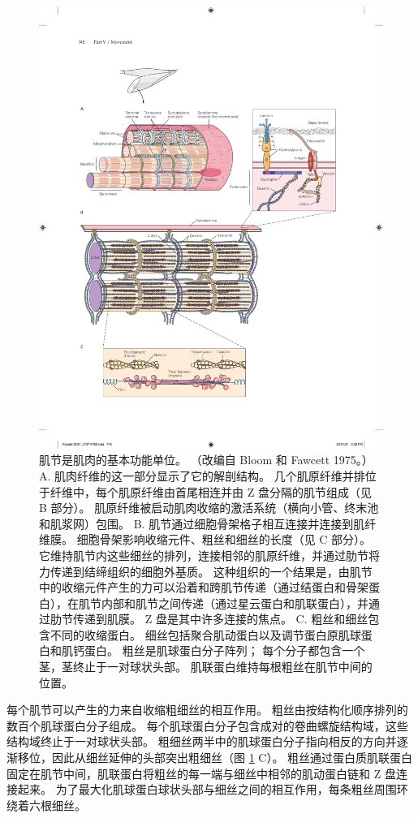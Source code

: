 \begin{figure}[htbp]
	\centering
	\includegraphics[width=0.9\linewidth]{chap31/fig_31_9}
	\caption{肌节是肌肉的基本功能单位。 （改编自 Bloom 和 Fawcett 1975。） A. 肌肉纤维的这一部分显示了它的解剖结构。 几个肌原纤维并排位于纤维中，每个肌原纤维由首尾相连并由 Z 盘分隔的肌节组成（见 B 部分）。 肌原纤维被启动肌肉收缩的激活系统（横向小管、终末池和肌浆网）包围。 B. 肌节通过细胞骨架格子相互连接并连接到肌纤维膜。 细胞骨架影响收缩元件、粗丝和细丝的长度（见 C 部分）。 它维持肌节内这些细丝的排列，连接相邻的肌原纤维，并通过肋节将力传递到结缔组织的细胞外基质。 这种组织的一个结果是，由肌节中的收缩元件产生的力可以沿着和跨肌节传递（通过结蛋白和骨架蛋白），在肌节内部和肌节之间传递（通过星云蛋白和肌联蛋白），并通过肋节传递到肌膜。 Z 盘是其中许多连接的焦点。 C. 粗丝和细丝包含不同的收缩蛋白。 细丝包括聚合肌动蛋白以及调节蛋白原肌球蛋白和肌钙蛋白。 粗丝是肌球蛋白分子阵列； 每个分子都包含一个茎，茎终止于一对球状头部。 肌联蛋白维持每根粗丝在肌节中间的位置。}
	\label{fig:31_9}
\end{figure}


每个肌节可以产生的力来自收缩粗细丝的相互作用。
粗丝由按结构化顺序排列的数百个肌球蛋白分子组成。
每个肌球蛋白分子包含成对的卷曲螺旋结构域，这些结构域终止于一对球状头部。
粗细丝两半中的肌球蛋白分子指向相反的方向并逐渐移位，因此从细丝延伸的头部突出粗细丝（图 \ref{fig:31_9} C）。
粗丝通过蛋白质肌联蛋白固定在肌节中间，肌联蛋白将粗丝的每一端与细丝中相邻的肌动蛋白链和 Z 盘连接起来。
为了最大化肌球蛋白球状头部与细丝之间的相互作用，每条粗丝周围环绕着六根细丝。


